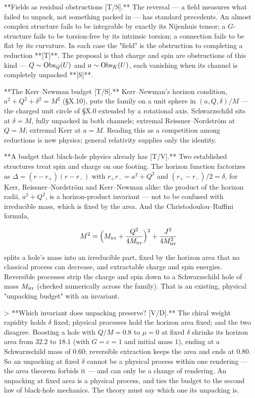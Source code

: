 **Fields as residual obstructions [T/S].** The reversal — a field measures what failed to unpack, not something packed in — has standard precedents. An almost complex structure fails to be integrable by exactly its Nijenhuis tensor; a $G$-structure fails to be torsion-free by its intrinsic torsion; a connection fails to be flat by its curvature. In each case the "field" is the obstruction to completing a reduction **[T]**. The proposal is that charge and spin are obstructions of this kind — $Q\sim{\rm Obs}_Q(U)$ and $a\sim{\rm Obs}_K(U)$, each vanishing when its channel is completely unpacked **[S]**.

**The Kerr–Newman budget [T/S].** Kerr–Newman's horizon condition, $a^2+Q^2+\delta^2 = M^2$ (§X.10), puts the family on a unit sphere in $(a,Q,\delta)/M$ — the charged unit circle of §X.0 extended by a rotational axis. Schwarzschild sits at $\delta = M$, fully unpacked in both channels; extremal Reissner–Nordström at $Q = M$; extremal Kerr at $a = M$. Reading this as a competition among reductions is new physics; general relativity supplies only the identity.

**A budget that black-hole physics already has [T/V].** Two established structures treat spin and charge on one footing. The horizon function factorizes as $\Delta = (r-r_+)(r-r_-)$ with $r_+r_- = a^2+Q^2$ and $(r_+-r_-)/2 = \delta$, for Kerr, Reissner–Nordström and Kerr–Newman alike: the product of the horizon radii, $a^2+Q^2$, is a horizon-product invariant — not to be confused with irreducible mass, which is fixed by the area. And the Christodoulou–Ruffini formula,

$$M^2 = \Big(M_{\rm irr}+\frac{Q^2}{4M_{\rm irr} }\Big)^2+\frac{J^2}{4M_{\rm irr}^2}$$

splits a hole's mass into an irreducible part, fixed by the horizon area that no classical process can decrease, and extractable charge and spin energies. Reversible processes strip the charge and spin down to a Schwarzschild hole of mass $M_{\rm irr}$ (checked numerically across the family). That is an existing, physical "unpacking budget" with an invariant.

> **Which invariant does unpacking preserve? [V/D].** The chiral weight rapidity holds $\delta$ fixed; physical processes hold the horizon area fixed; and the two disagree. Boosting a hole with $Q/M = 0.8$ to $\mu = 0$ at fixed $\delta$ shrinks its horizon area from $32.2$ to $18.1$ (with $G = c = 1$ and initial mass $1$), ending at a Schwarzschild mass of $0.60$; reversible extraction keeps the area and ends at $0.80$. So an unpacking at fixed $\delta$ cannot be a physical process within one rendering — the area theorem forbids it — and can only be a change of rendering. An unpacking at fixed area is a physical process, and ties the budget to the second law of black-hole mechanics. The theory must say which one its unpacking is.

